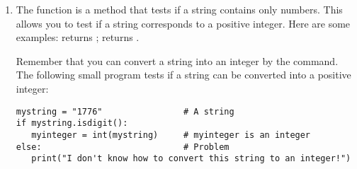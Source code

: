 \documentclass[11pt,class=report,crop=false]{standalone}
\begin{document}
\begin{cours}
\begin{enumerate}
\medskip

  \item The  function is a \Python{}    method that tests if a string contains only numbers. This allows you to test if a string corresponds to a positive integer.
 Here are some examples:  returns ;  returns .
 
 Remember that you can convert a string into an integer by the  command. The following small program tests if a string can be converted into a positive integer:
 
\begin{lstlisting}
mystring = "1776"                # A string
if mystring.isdigit():
   myinteger = int(mystring)     # myinteger is an integer
else:                            # Problem
   print("I don't know how to convert this string to an integer!")
\end{lstlisting} 

\end{enumerate}  
\end{cours}

\bigskip

\end{document}
